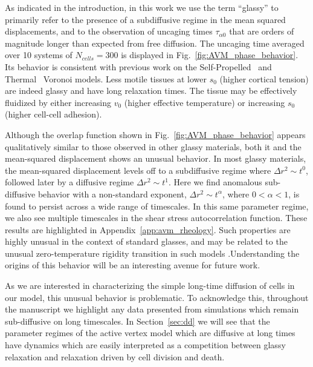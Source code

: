 \documentclass[
reprint
,aps
,amssymb
,amsmath
,superscriptaddress
]{revtex4-1}
\begin{document}
As indicated in the introduction, in this work we use the term ``glassy'' to primarily refer to the presence of a subdiffusive regime in the mean squared displacements, and to the observation of uncaging times $\tau_{\alpha0}$ that are orders of magnitude longer than expected from free diffusion. %
The uncaging time averaged over 10 systems of $N_{cells}=300$ is displayed in Fig.~\ref{fig:AVM_phase_behavior}. Its behavior is consistent with previous work on the Self-Propelled~\cite{Bi2016} and Thermal~\cite{Sussman2018-2} Voronoi models. Less motile tissues at lower $s_0$ (higher cortical tension) are indeed glassy and have long relaxation times. The tissue may be effectively fluidized by either increasing $v_0$ (higher effective temperature) or increasing $s_0$ (higher cell-cell adhesion). 

Although the overlap function shown in Fig.~\ref{fig:AVM_phase_behavior} appears qualitatively similar to those observed in other glassy materials, %
both it and the mean-squared displacement shows an unusual behavior.  In most glassy materials, the mean-squared displacement levels off to a subdiffusive regime where $\Delta r^2 \sim t^0$,  followed later by a diffusive regime $\Delta r^2 \sim t^1$.  Here we find anomalous sub-diffusive behavior with a non-standard exponent, $\Delta r^2 \sim t^\alpha$, where $0< \alpha < 1$, is found to persist across a wide range of timescales. In this same parameter regime, we also see multiple timescales in the shear stress autocorrelation function. These results are highlighted in Appendix~\ref{app:avm_rheology}.  Such properties are highly unusual in the context of standard glasses, and may be related to the unusual zero-temperature rigidity transition in such models \cite{Sussman2017-2}.Understanding the origins of this behavior will be an interesting avenue for future work.

As we are interested in characterizing the simple long-time diffusion of cells in our model, this unusual behavior is problematic. To acknowledge this, throughout the manuscript we highlight any data presented from simulations which remain sub-diffusive on long timescales. In Section~\ref{sec:dd} we will see that the parameter regimes of the active vertex model which are diffusive at long times have dynamics which are easily interpreted as a competition between glassy relaxation and relaxation driven by cell division and death.
\end{document}
